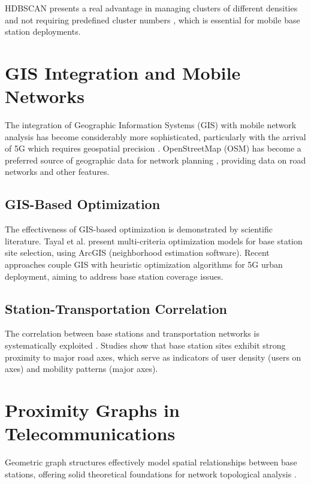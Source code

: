 \documentclass[12pt,a4paper]{report}
\begin{document}
HDBSCAN presents a real advantage in managing clusters of different densities and not requiring predefined cluster numbers \cite{campello2013density}, which is essential for mobile base station deployments.

\section{GIS Integration and Mobile Networks}

The integration of Geographic Information Systems (GIS) with mobile network analysis has become considerably more sophisticated, particularly with the arrival of 5G which requires geospatial precision \cite{etsi20235g}. OpenStreetMap (OSM) has become a preferred source of geographic data for network planning \cite{osm2024planet}, providing data on road networks and other features.

\subsection{GIS-Based Optimization}

The effectiveness of GIS-based optimization is demonstrated by scientific literature. Tayal et al. \cite{tayal2020optimization} present multi-criteria optimization models for base station site selection, using ArcGIS (neighborhood estimation software). Recent approaches \cite{elshrkasi2022optimizing} couple GIS with heuristic optimization algorithms for 5G urban deployment, aiming to address base station coverage issues.

\subsection{Station-Transportation Correlation}

The correlation between base stations and transportation networks is systematically exploited \cite{tayal2020optimization}. Studies show that base station sites exhibit strong proximity to major road axes, which serve as indicators of user density (users on axes) and mobility patterns (major axes).

\section{Proximity Graphs in Telecommunications}

Geometric graph structures effectively model spatial relationships between base stations, offering solid theoretical foundations for network topological analysis \cite{gabriel1969statistical}.
\end{document}
